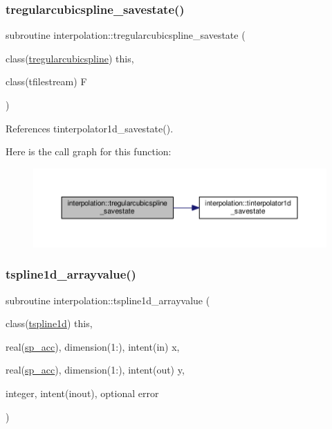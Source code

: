 \subsubsection{\texorpdfstring{tregularcubicspline\+\_\+savestate()}{tregularcubicspline\_savestate()}}
{\footnotesize\ttfamily subroutine interpolation\+::tregularcubicspline\+\_\+savestate (\begin{DoxyParamCaption}\item[{class(\mbox{\hyperlink{structinterpolation_1_1tregularcubicspline}{tregularcubicspline}})}]{this,  }\item[{class(tfilestream)}]{F }\end{DoxyParamCaption})}



References tinterpolator1d\+\_\+savestate().

Here is the call graph for this function\+:
\nopagebreak
\begin{figure}[H]
\begin{center}
\leavevmode
\includegraphics[width=350pt]{namespaceinterpolation_a387cdc39d5949cc2aa2e5c6f483ea76c_cgraph}
\end{center}
\end{figure}
\mbox{\label{namespaceinterpolation_a1bb0d4fae1b5125618e2e9f67669bd3c}} 
\subsubsection{\texorpdfstring{tspline1d\+\_\+arrayvalue()}{tspline1d\_arrayvalue()}}
{\footnotesize\ttfamily subroutine interpolation\+::tspline1d\+\_\+arrayvalue (\begin{DoxyParamCaption}\item[{class(\mbox{\hyperlink{structinterpolation_1_1tspline1d}{tspline1d}})}]{this,  }\item[{real(\mbox{\hyperlink{namespaceinterpolation_af72aa9a05feb8ef90b2d26e4a013abf3}{sp\+\_\+acc}}), dimension(1\+:), intent(in)}]{x,  }\item[{real(\mbox{\hyperlink{namespaceinterpolation_af72aa9a05feb8ef90b2d26e4a013abf3}{sp\+\_\+acc}}), dimension(1\+:), intent(out)}]{y,  }\item[{integer, intent(inout), optional}]{error }\end{DoxyParamCaption})}



